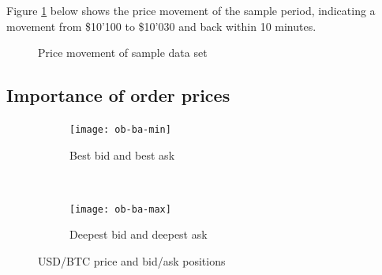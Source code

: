 Figure \ref{fig:data-price-movement} below shows the price movement of the sample period, indicating a movement from \$10'100 to \$10'030 and back within 10 minutes.

\begin{figure}[H]
    \centering
    \caption{Price movement of sample data set}
    \label{fig:data-price-movement}
\end{figure}

\subsection{Importance of order prices}
\label{sec:data-hypthesis-order-price}

\begin{figure}[H]
    \centering
    \begin{subfigure}[b]{0.45\textwidth}
        \texttt{[image: ob-ba-min]}
        \caption{Best bid and best ask}
        \label{fig:ob-ba-min}
    \end{subfigure}
    ~ %
    \begin{subfigure}[b]{0.45\textwidth}
        \texttt{[image: ob-ba-max]}
        \caption{Deepest bid and deepest ask}
        \label{fig:ob-ba-max}
    \end{subfigure}
    \caption{USD/BTC price and bid/ask positions}\label{fig:animals}
\end{figure}

